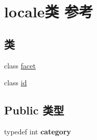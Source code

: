 \hypertarget{classlocale}{}\section{locale类 参考}
\label{classlocale}
\subsection*{类}
\begin{DoxyCompactItemize}
\item 
class \hyperlink{classlocale_1_1facet}{facet}
\item 
class \hyperlink{classlocale_1_1id}{id}
\end{DoxyCompactItemize}
\subsection*{Public 类型}
\begin{DoxyCompactItemize}
\item 
\mbox{\label{classlocale_aef94d17a7e57566f0f5408321a02cf41}} 
typedef int {\bfseries category}
\end{DoxyCompactItemize}
